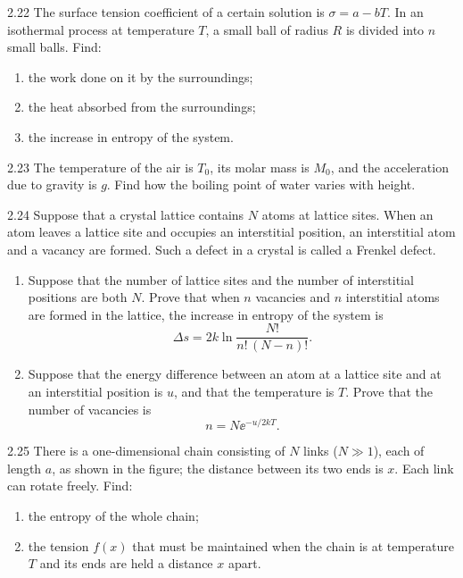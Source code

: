 \begin{problem}{2.22}
The surface tension coefficient of a certain solution is $\sigma = a-bT$. In an isothermal process at temperature $T$, a small ball of radius $R$ is divided into $n$ small balls. Find:
\begin{enumerate}[label=(\arabic*),leftmargin=2.2em,itemsep=1pt,topsep=2pt]
\item the work done on it by the surroundings;
\item the heat absorbed from the surroundings;
\item the increase in entropy of the system.
\end{enumerate}
\end{problem}

\begin{problem}{2.23}
The temperature of the air is $T_0$, its molar mass is $M_0$, and the acceleration due to gravity is $g$. Find how the boiling point of water varies with height.
\end{problem}

\begin{problem}{2.24}
Suppose that a crystal lattice contains $N$ atoms at lattice sites. When an atom leaves a lattice site and occupies an interstitial position, an interstitial atom and a vacancy are formed. Such a defect in a crystal is called a Frenkel defect.
\begin{enumerate}[label=(\arabic*),leftmargin=2.2em,itemsep=1pt,topsep=2pt]
\item Suppose that the number of lattice sites and the number of interstitial positions are both $N$. Prove that when $n$ vacancies and $n$ interstitial atoms are formed in the lattice, the increase in entropy of the system is
\[
\Delta s = 2k\ln\frac{N!}{n!\,(N-n)!}.
\]
\item Suppose that the energy difference between an atom at a lattice site and at an interstitial position is $u$, and that the temperature is $T$. Prove that the number of vacancies is
\[
n = N\ee^{-u/2kT}.
\]
\end{enumerate}
\end{problem}

\begin{problem}{2.25}
There is a one-dimensional chain consisting of $N$ links ($N\gg1$), each of length $a$, as shown in the figure; the distance between its two ends is $x$. Each link can rotate freely. Find:
\begin{enumerate}[label=(\arabic*),leftmargin=2.2em,itemsep=1pt,topsep=2pt]
\item the entropy of the whole chain;
\item the tension $f(x)$ that must be maintained when the chain is at temperature $T$ and its ends are held a distance $x$ apart.
\end{enumerate}
\end{problem}

